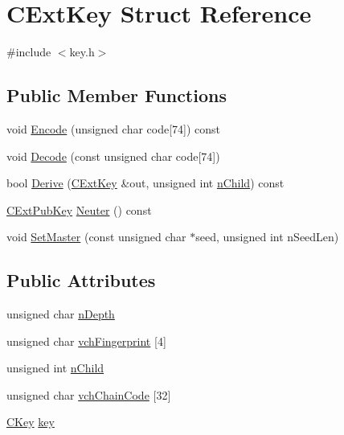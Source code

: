 \hypertarget{struct_c_ext_key}{}\section{C\+Ext\+Key Struct Reference}
\label{struct_c_ext_key}


{\ttfamily \#include $<$key.\+h$>$}

\subsection*{Public Member Functions}
\begin{DoxyCompactItemize}
\item 
void \hyperlink{struct_c_ext_key_aa60d612abaa124e00f66f81ac4a74699}{Encode} (unsigned char code\mbox{[}74\mbox{]}) const 
\item 
void \hyperlink{struct_c_ext_key_a9720e119745472336b6729e19f0819dd}{Decode} (const unsigned char code\mbox{[}74\mbox{]})
\item 
bool \hyperlink{struct_c_ext_key_a2fa3a39434ae09efbbd4058d1d081aa2}{Derive} (\hyperlink{struct_c_ext_key}{C\+Ext\+Key} \&out, unsigned int \hyperlink{struct_c_ext_key_ad15cb7ab68b59495eec71f6586803048}{n\+Child}) const 
\item 
\hyperlink{struct_c_ext_pub_key}{C\+Ext\+Pub\+Key} \hyperlink{struct_c_ext_key_a49f98a470d61ab1f2948b7c414ec9563}{Neuter} () const 
\item 
void \hyperlink{struct_c_ext_key_a8cd6ecafdd649082601d7eebbec79688}{Set\+Master} (const unsigned char $\ast$seed, unsigned int n\+Seed\+Len)
\end{DoxyCompactItemize}
\subsection*{Public Attributes}
\begin{DoxyCompactItemize}
\item 
unsigned char \hyperlink{struct_c_ext_key_ab197a253f41646975405b4ead8027b55}{n\+Depth}
\item 
unsigned char \hyperlink{struct_c_ext_key_a22efb3f5dfb26cd8d88d2ab5db885978}{vch\+Fingerprint} \mbox{[}4\mbox{]}
\item 
unsigned int \hyperlink{struct_c_ext_key_ad15cb7ab68b59495eec71f6586803048}{n\+Child}
\item 
unsigned char \hyperlink{struct_c_ext_key_a637ce75955e2883d20172b707c26a459}{vch\+Chain\+Code} \mbox{[}32\mbox{]}
\item 
\hyperlink{class_c_key}{C\+Key} \hyperlink{struct_c_ext_key_a93cd93ef3311d9dbcf475282a5f80fb2}{key}
\end{DoxyCompactItemize}
